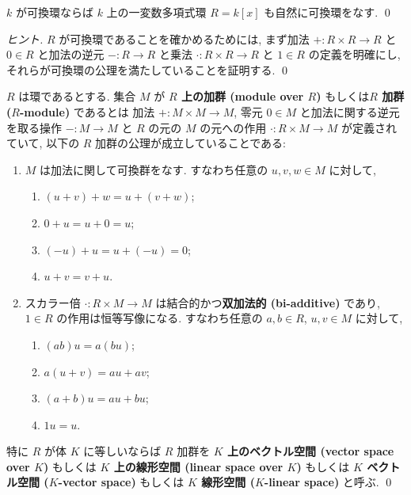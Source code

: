 \documentclass[12pt,twoside]{jarticle}
\begin{document}

\begin{question}[可換環上の多項式環, 5点]
  $k$ が可換環ならば $k$ 上の一変数多項式環 $R=k[x]$ も自然に可換環をなす.
  \qed
\end{question}

\begin{proof}[ヒント]
  $R$ が可換環であることを確かめるためには,
  まず加法 $+:R\times R\to R$ 
  と $0\in R$
  と加法の逆元 $-:R\to R$
  と乗法 $\cdot:R\times R\to R$
  と $1\in R$ の定義を明確にし, 
  それらが可換環の公理を満たしていることを証明する.
  \qed
\end{proof}


\begin{definition}[環上の加群と体上のベクトル空間]
  $R$ は環であるとする.
  集合 $M$ が {\bf $R$ 上の加群 (module over $R$)} 
  もしくは{\bf $R$ 加群 ($R$-module)} であるとは
  加法 $+:M\times M\to M$, 零元 $0\in M$ 
  と加法に関する逆元を取る操作 $-:M\to M$ 
  と $R$ の元の $M$ の元への作用 $\cdot:R\times M\to M$ が定義されていて, 
  以下の $R$ 加群の公理が成立していることである:
  \begin{enumerate}
  \item $M$ は加法に関して可換群をなす. 
    すなわち任意の $u,v,w\in M$ に対して,
    \begin{enumerate}
    \item $(u + v) + w = u + (v + w)$;
    \item $0 + u = u + 0 = u$;
    \item $(-u) + u = u + (-u) = 0$;
    \item $u + v = v + u$.
    \end{enumerate}
  \item スカラー倍 $\cdot:R\times M\to M$ は結合的かつ{\bf 双加法的 
      (bi-additive)} であり, $1\in R$ の作用は恒等写像になる.
    すなわち任意の $a,b\in R$, $u,v\in M$ に対して,
    \begin{enumerate}
    \item $(ab)u = a(bu)$;
    \item $a(u + v) = au + av$;
    \item $(a + b)u = au + bu$;
    \item $1u = u$.
    \end{enumerate}
  \end{enumerate}
  特に $R$ が体 $K$ に等しいならば $R$ 加群を
  {\bf $K$ 上のベクトル空間 (vector space over $K$)} もしくは
  {\bf $K$ 上の線形空間 (linear space over $K$)} もしくは
  {\bf $K$ ベクトル空間 ($K$-vector space)} もしくは
  {\bf $K$ 線形空間 ($K$-linear space)} と呼ぶ.
  \qed
\end{definition}
\end{document}
